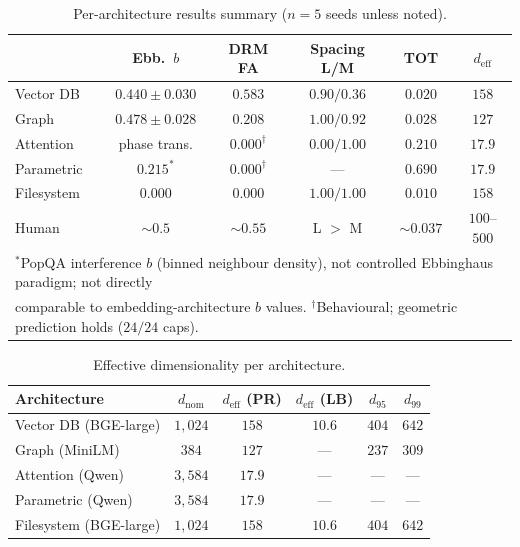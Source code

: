 \documentclass[11pt]{article}
\begin{document}
\begin{table}[!ht]
\centering
\caption{Per-architecture results summary ($n = 5$ seeds unless noted).}
\label{tab:perarch}
\small
\begin{tabular}{@{}lccccc@{}}
\toprule
 & \textbf{Ebb.\ $b$} & \textbf{DRM FA} & \textbf{Spacing L/M} & \textbf{TOT} & \textbf{$d_\text{eff}$} \\
\midrule
Vector DB & $0.440 \pm 0.030$ & $0.583$ & $0.90 / 0.36$ & $0.020$ & $158$ \\
Graph & $0.478 \pm 0.028$ & $0.208$ & $1.00 / 0.92$ & $0.028$ & $127$ \\
Attention & phase trans. & $0.000^\dagger$ & $0.00 / 1.00$ & $0.210$ & $17.9$ \\
Parametric & $0.215^*$ & $0.000^\dagger$ & --- & $0.690$ & $17.9$ \\
Filesystem & $0.000$ & $0.000$ & $1.00 / 1.00$ & $0.010$ & $158$ \\
\midrule
Human & ${\sim}0.5$ & ${\sim}0.55$ & L $>$ M & ${\sim}0.037$ & $100$--$500$ \\
\bottomrule
\multicolumn{6}{l}{\footnotesize $^*$PopQA interference $b$ (binned neighbour density), not controlled Ebbinghaus paradigm; not directly} \\
\multicolumn{6}{l}{\footnotesize comparable to embedding-architecture $b$ values. $^\dagger$Behavioural; geometric prediction holds ($24/24$ caps).}
\end{tabular}
\end{table}

\begin{table}[!ht]
\centering
\caption{Effective dimensionality per architecture.}
\label{tab:deff}
\small
\begin{tabular}{@{}lccccc@{}}
\toprule
\textbf{Architecture} & $d_\text{nom}$ & $d_\text{eff}$ (PR) & $d_\text{eff}$ (LB) & $d_{95}$ & $d_{99}$ \\
\midrule
Vector DB (BGE-large) & $1{,}024$ & $158$ & $10.6$ & $404$ & $642$ \\
Graph (MiniLM) & $384$ & $127$ & --- & $237$ & $309$ \\
Attention (Qwen) & $3{,}584$ & $17.9$ & --- & --- & --- \\
Parametric (Qwen) & $3{,}584$ & $17.9$ & --- & --- & --- \\
Filesystem (BGE-large) & $1{,}024$ & $158$ & $10.6$ & $404$ & $642$ \\
\bottomrule
\end{tabular}
\end{table}
\end{document}

